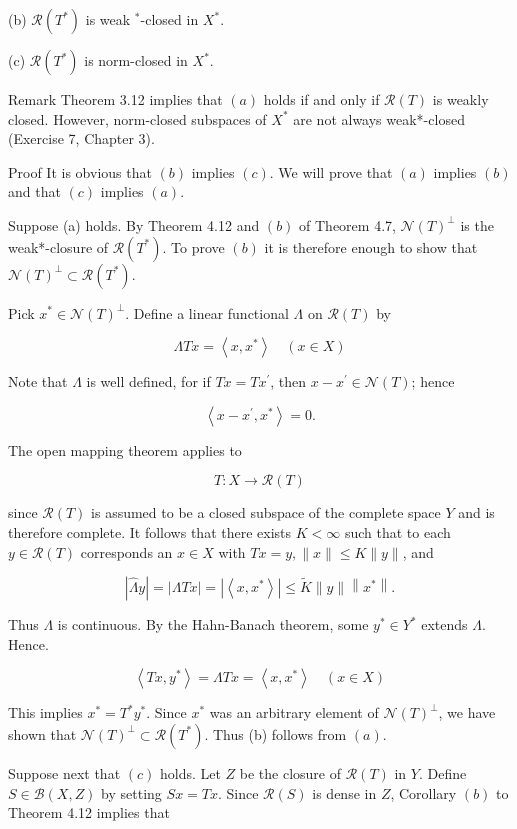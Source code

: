 \documentclass[10pt]{article}
\begin{document}
(b) $\mathscr{R}\left(T^{*}\right)$ is weak ${ }^{*}$-closed in $X^{*}$.

(c) $\mathscr{R}\left(T^{*}\right)$ is norm-closed in $X^{*}$.

Remark Theorem 3.12 implies that $(a)$ holds if and only if $\mathscr{R}(T)$ is weakly closed. However, norm-closed subspaces of $X^{*}$ are not always weak*-closed (Exercise 7, Chapter 3).

Proof It is obvious that $(b)$ implies $(c)$. We will prove that $(a)$ implies $(b)$ and that $(c)$ implies $(a)$.

Suppose (a) holds. By Theorem 4.12 and $(b)$ of Theorem 4.7, $\mathscr{N}(T)^{\perp}$ is the weak*-closure of $\mathscr{R}\left(T^{*}\right)$. To prove $(b)$ it is therefore enough to show that $\mathscr{N}(T)^{\perp} \subset \mathscr{R}\left(T^{*}\right)$.

Pick $x^{*} \in \mathscr{N}(T)^{\perp}$. Define a linear functional $\Lambda$ on $\mathscr{R}(T)$ by

$$
\Lambda T x=\left\langle x, x^{*}\right\rangle \quad(x \in X)
$$

Note that $\Lambda$ is well defined, for if $T x=T x^{\prime}$, then $x-x^{\prime} \in \mathscr{N}(T)$; hence

$$
\left\langle x-x^{\prime}, x^{*}\right\rangle=0 .
$$

The open mapping theorem applies to

$$
T: X \rightarrow \mathscr{R}(T)
$$

since $\mathscr{R}(T)$ is assumed to be a closed subspace of the complete space $Y$ and is therefore complete. It follows that there exists $K<\infty$ such that to each $y \in \mathscr{R}(T)$ corresponds an $x \in X$ with $T x=y,\|x\| \leq K\|y\|$, and

$$
|\hat{\Lambda} y|=|\Lambda T x|=\left|\left\langle x, x^{*}\right\rangle\right| \leq \tilde{K}\|y\|\left\|x^{*}\right\| .
$$

Thus $\Lambda$ is continuous. By the Hahn-Banach theorem, some $y^{*} \in Y^{*}$ extends $\Lambda$. Hence.

$$
\left\langle T x, y^{*}\right\rangle=\Lambda T x=\left\langle x, x^{*}\right\rangle \quad(x \in X)
$$

This implies $x^{*}=T^{*} y^{*}$. Since $x^{*}$ was an arbitrary element of $\mathscr{N}(T)^{\perp}$, we have shown that $\mathscr{N}(T)^{\perp} \subset \mathscr{R}\left(T^{*}\right)$. Thus (b) follows from $(a)$.

Suppose next that $(c)$ holds. Let $Z$ be the closure of $\mathscr{R}(T)$ in $Y$. Define $S \in \mathscr{B}(X, Z)$ by setting $S x=T x$. Since $\mathscr{R}(S)$ is dense in $Z$, Corollary $(b)$ to Theorem 4.12 implies that
\end{document}
